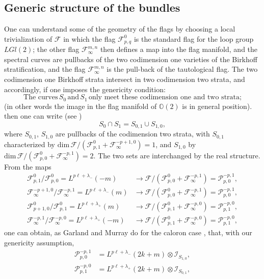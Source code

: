 \documentclass[12pt]{article}
\theoremstyle{definition}
\theoremstyle{remark}
\numberwithin{theorem}{section}
\def\bO{{\mathbb {O}}}
\def\pF{{\mathcal F}}
\def\pI{{\mathcal I}}
\def\pP{{\mathcal P}}
\begin{document}
 \subsection{Generic structure of the bundles}
  
One can understand some of the geometry of the flags by choosing a local trivialization of $\pF$ in which the flag $\pF^0_{p,q}$ is the standard  flag for the loop group $LGl(2)$; the other flag $\pF_\infty^{m,n}$ then  defines a map into the flag manifold, and the spectral curves are pullbacks of the two  codimension one varieties of the Birkhoff stratification, and the flag $\pF_\infty^{m,n}$ is the pull-back of the tautological flag. The two codimension one Birkhoff strata intersect in two codimension two strata, and accordingly, if one imposes the genericity condition:
\begin{equation} \label{genericity} 
    {\text{The curves}}\, S_0\, {\text{and}}\, S_1\,  {\text{only meet these codimension  one and two strata;}} 
    \end{equation} 
(in other words the image in the flag manifold of $\bO(2)$ is in general position).  then one can write (see \cite{murray-monopoles, Garland-Murray}) 
$$ S_0\cap S_1 = S_{0,1}\cup S_{1,0},$$
where $S_{0,1}$, $S_{1,0}$ are pullbacks of the codimension two strata, with $S_{0,1}$  characterized by 
$\mathrm{dim}\, \pF/(\pF^0_{p,1} + \pF_\infty^{-p+1,0}) =1$,
and $S_{1,0}$ by 
$\mathrm{dim}\, \pF/(\pF^0_{p,0} + \pF_\infty^{-p,1}) = 2.$ 
The two sets are interchanged by the real structure. From the maps 
\begin{align*}   \pF^0_{ p,1}/ \pF^0_{ p,0} =  L^{p\ell + \lambda_-}(-m)& \rightarrow  \pF/(\pF^0_{p,0}+\pF_\infty^{-p ,1})=\pP_{p,0}^{-p ,1},\\
 \pF_\infty^{-p+1,0}/\pF_\infty^{-p,1}= L^{p\ell + \lambda_-}(m) & \rightarrow  \pF/(\pF^0_{p,0}+\pF_\infty^{-p ,1})= \pP_{p,0}^{-p ,1},\\
  \pF^0_{ p+1,0}/ \pF^0_{ p,1} =  L^{p\ell +\lambda_+}(m)&\rightarrow \pF/(\pF^0_{p ,1}+\pF_\infty^{-p ,0})=\pP_{p ,1}^{-p ,0},\\ 
 \pF_\infty^{-p,1}/\pF_\infty^{-p,0}= L^{ p\ell+\lambda_+}(-m)&\rightarrow \pF/(\pF^0_{p ,1}+\pF_\infty^{-p ,0})=\pP_{p ,1}^{-p ,0},
  \end{align*}
one can obtain, as   Garland and Murray do for the caloron case \cite[Section 6]{Garland-Murray}, that, with our genericity assumption,
 \begin{align}\pP_{p,0}^{-p ,1} &= L^{p\ell + \lambda_-}(2k+m)\otimes \pI_{S_{1,0}},\\
\pP_{p ,1}^{-p ,0}&=  L^{p\ell +\lambda_+}(2k+m)\otimes \pI_{S_{0,1}},
 \end{align}
\end{document}
